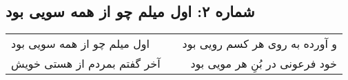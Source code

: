 \begin{center}
\section*{شماره ۲: اول میلم چو از همه سویی بود}
\label{sec:002}
\begin{longtable}{l p{0.5cm} r}
اول میلم چو از همه سویی بود
&&
و آورده به روی هر کسم رویی بود
\\
آخر گفتم بمردم از هستی خویش
&&
خود فرعونی در بُنِ هر مویی بود
\\
\end{longtable}
\end{center}
